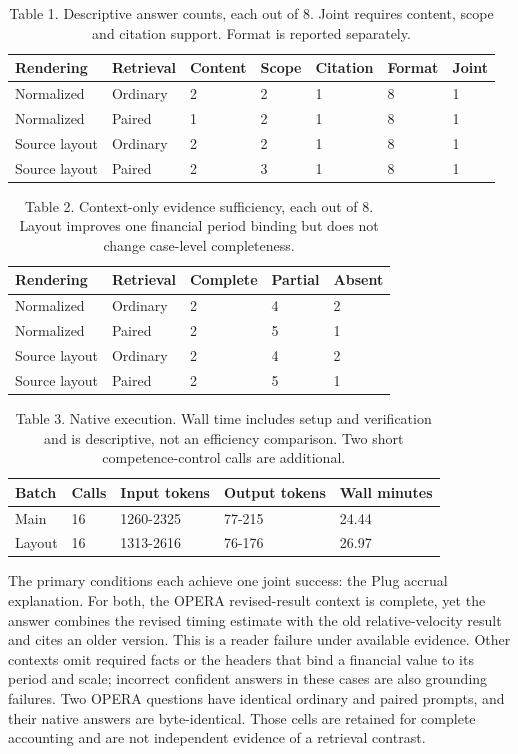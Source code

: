 \documentclass[11pt]{article}
\begin{document}
\begin{table}[ht]
\centering\small
\begin{tabular}{@{}lllllll@{}}
\toprule
Rendering & Retrieval & Content & Scope & Citation & Format & Joint \\
\midrule
Normalized & Ordinary & 2 & 2 & 1 & 8 & 1 \\
Normalized & Paired & 1 & 2 & 1 & 8 & 1 \\
Source layout & Ordinary & 2 & 2 & 1 & 8 & 1 \\
Source layout & Paired & 2 & 3 & 1 & 8 & 1 \\
\bottomrule
\end{tabular}
\caption*{Table 1. Descriptive answer counts, each out of 8. Joint requires content, scope and citation support. Format is reported separately.}
\end{table}
\begin{table}[ht]
\centering\small
\begin{tabular}{@{}lllll@{}}
\toprule
Rendering & Retrieval & Complete & Partial & Absent \\
\midrule
Normalized & Ordinary & 2 & 4 & 2 \\
Normalized & Paired & 2 & 5 & 1 \\
Source layout & Ordinary & 2 & 4 & 2 \\
Source layout & Paired & 2 & 5 & 1 \\
\bottomrule
\end{tabular}
\caption*{Table 2. Context-only evidence sufficiency, each out of 8. Layout improves one financial period binding but does not change case-level completeness.}
\end{table}
\begin{table}[ht]
\centering\small
\begin{tabular}{@{}lllll@{}}
\toprule
Batch & Calls & Input tokens & Output tokens & Wall minutes \\
\midrule
Main & 16 & 1260-2325 & 77-215 & 24.44 \\
Layout & 16 & 1313-2616 & 76-176 & 26.97 \\
\bottomrule
\end{tabular}
\caption*{Table 3. Native execution. Wall time includes setup and verification and is descriptive, not an efficiency comparison. Two short competence-control calls are additional.}
\end{table}
The primary conditions each achieve one joint success: the Plug accrual explanation. For both, the OPERA revised-result context is complete, yet the answer combines the revised timing estimate with the old relative-velocity result and cites an older version. This is a reader failure under available evidence. Other contexts omit required facts or the headers that bind a financial value to its period and scale; incorrect confident answers in these cases are also grounding failures. Two OPERA questions have identical ordinary and paired prompts, and their native answers are byte-identical. Those cells are retained for complete accounting and are not independent evidence of a retrieval contrast.
\end{document}
